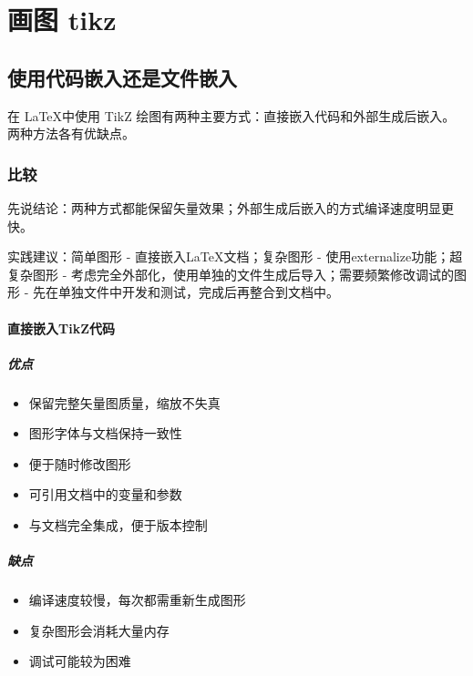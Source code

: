\chapter{画图 tikz}

\section{使用代码嵌入还是文件嵌入}

在 \LaTeX 中使用 TikZ 绘图有两种主要方式：直接嵌入代码和外部生成后嵌入。两种方法各有优缺点。

\subsection{比较}

先说结论：两种方式都能保留矢量效果；外部生成后嵌入的方式编译速度明显更快。

实践建议：简单图形 - 直接嵌入LaTeX文档；复杂图形 - 使用externalize功能；超复杂图形 - 考虑完全外部化，使用单独的文件生成后导入；需要频繁修改调试的图形 - 先在单独文件中开发和测试，完成后再整合到文档中。

\subsubsection{直接嵌入TikZ代码}

\paragraph{优点}

\begin{itemize}
    \item 保留完整矢量图质量，缩放不失真
    \item 图形字体与文档保持一致性
    \item 便于随时修改图形
    \item 可引用文档中的变量和参数
    \item 与文档完全集成，便于版本控制
\end{itemize}

\paragraph{缺点}

\begin{itemize}
    \item 编译速度较慢，每次都需重新生成图形
    \item 复杂图形会消耗大量内存
    \item 调试可能较为困难
\end{itemize}

